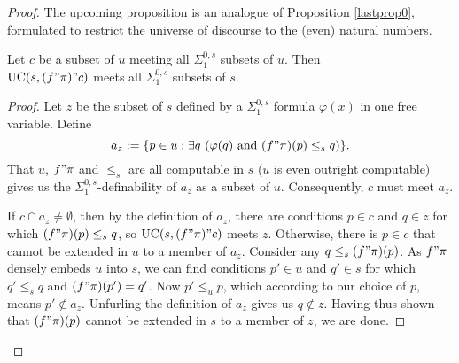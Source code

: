 \documentclass[12pt]{article}
\numberwithin{equation}{section}
\begin{document}
\begin{proof}
The upcoming proposition is an analogue of Proposition \ref{lastprop0}, formulated to restrict the universe of discourse to the (even) natural numbers. 

\begin{prop}\label{lastprop}
Let $c$ be a subset of $u$ meeting all $\Sigma^{0, s}_1$ subsets of $u$. Then \\ $\mathrm{UC}(s, (f" \pi)" c)$ meets all $\Sigma^{0, s}_1$ subsets of $s$.
\end{prop}

\begin{proof}
Let $z$ be the subset of $s$ defined by a $\Sigma^{0, s}_1$ formula $\varphi(x)$ in one free variable. Define $$a_z := \{p \in u : \exists q \ (\varphi(q) \text{ and } (f" \pi)(p) \leq_s q)\} \text{.}$$ That $u$, $f" \pi$ and $\leq_s$ are all computable in $s$ ($u$ is even outright computable) gives us the $\Sigma^{0, s}_1$-definability of $a_z$ as a subset of $u$. Consequently, $c$ must meet $a_z$.

If $c \cap a_z \neq \emptyset$, then by the definition of $a_z$, there are conditions $p \in c$ and $q \in z$ for which $(f" \pi)(p) \leq_s q$, so $\mathrm{UC}(s, (f" \pi)" c)$ meets $z$. Otherwise, there is $p \in c$ that cannot be extended in $u$ to a member of $a_z$. Consider any $q \leq_s (f" \pi)(p)$. As $f" \pi$ densely embeds $u$ into $s$, we can find conditions $p' \in u$ and $q' \in s$ for which $q' \leq_s q$ and $(f" \pi)(p') = q'$. Now $p' \leq_u p$, which according to our choice of $p$, means $p' \not\in a_z$. Unfurling the definition of $a_z$ gives us $q \not\in z$. Having thus shown that $(f" \pi)(p)$ cannot be extended in $s$ to a member of $z$, we are done.
\end{proof}


\end{proof}
\end{document}
